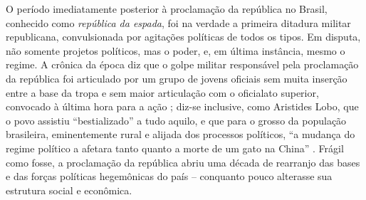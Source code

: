 O período imediatamente posterior à proclamação da república no Brasil, conhecido como \textit{república da espada}, foi na verdade a primeira ditadura militar republicana, convulsionada por agitações políticas de todos os tipos. Em disputa, não somente projetos políticos, mas o poder, e, em última instância, mesmo o regime. A crônica da época diz que o golpe militar responsável pela proclamação da república foi articulado por um grupo de jovens oficiais sem muita inserção entre a base da tropa e sem maior articulação com o oficialato superior, convocado à última hora para a ação \cite[p.~16]{cardoso_govmil_1977}; diz-se inclusive, como Aristides Lobo, que o povo assistiu ``bestializado'' a tudo aquilo, e que para o grosso da população brasileira, eminentemente rural e alijada dos processos políticos, ``a mudança do regime político a afetara tanto quanto a morte de um gato na China'' \cite[p.~43]{basbaum_histsinc_1967}. Frágil como fosse, a proclamação da república abriu uma década de rearranjo das bases e das forças políticas hegemônicas do país -- conquanto pouco alterasse sua estrutura social e econômica.

